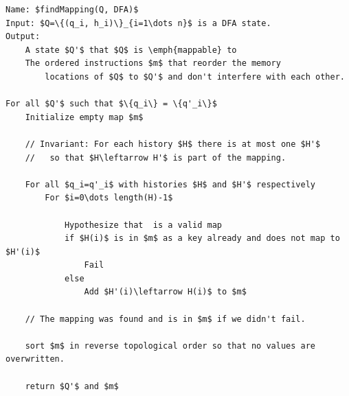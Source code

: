 \documentclass[english]{sigplanconf}
\theoremstyle{definition}
\begin{document}
\begin{algorithm*}
\begin{lstlisting}[mathescape,tabsize=2]
Name: $findMapping(Q, DFA)$
Input: $Q=\{(q_i, h_i)\}_{i=1\dots n}$ is a DFA state.
Output: 
	A state $Q'$ that $Q$ is \emph{mappable} to
	The ordered instructions $m$ that reorder the memory 
		locations of $Q$ to $Q'$ and don't interfere with each other.
    
For all $Q'$ such that $\{q_i\} = \{q'_i\}$
	Initialize empty map $m$
  
	// Invariant: For each history $H$ there is at most one $H'$
	//   so that $H\leftarrow H'$ is part of the mapping.
  
	For all $q_i=q'_i$ with histories $H$ and $H'$ respectively
		For $i=0\dots length(H)-1$
    
			Hypothesize that  is a valid map
			if $H(i)$ is in $m$ as a key already and does not map to $H'(i)$
				Fail
			else
				Add $H'(i)\leftarrow H(i)$ to $m$
        
	// The mapping was found and is in $m$ if we didn't fail.
  
	sort $m$ in reverse topological order so that no values are overwritten.
  
	return $Q'$ and $m$
\end{lstlisting}
\end{algorithm*}
\end{document}
